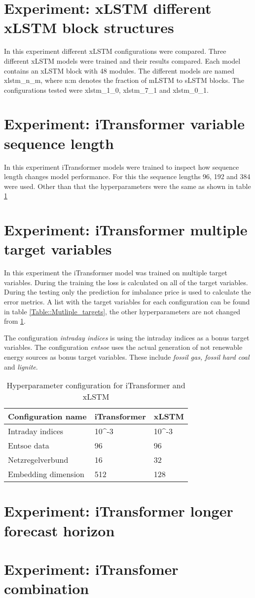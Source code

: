 \documentclass[class=scrbook, crop=false]{standalone}
\begin{document}
\section{Experiment: xLSTM different xLSTM block structures}

In this experiment different xLSTM configurations were compared. 
Three different xLSTM models were trained and their results compared.
Each model contains an xLSTM block with 48 modules.
The different models are named xlstm\_n\_m, where n:m denotes the fraction of mLSTM to sLSTM blocks.
The configurations tested were xlstm\_1\_0, xlstm\_7\_1 and xlstm\_0\_1. 

\section{Experiment: iTransformer variable sequence length}
   
   In this experiment iTransformer models were trained to inspect how sequence length changes model performance.
   For this the sequence lengths 96, 192 and 384 were used. Other than that the hyperparameters were the same as shown in table \ref{Table::raw_hyperparameters}   
   
\section{Experiment: iTransformer multiple target variables}

  In this experiment the iTransformer model was trained on multiple target variables.
  During the training the loss is calculated on all of the target variables. 
  During the testing only the prediction for imbalance price is used to calculate the error metrics.
  A list with the target variables for each configuration can be found in table \ref{Table::Mutliple_targets}, the other hyperparameters are not changed from \ref{Table::raw_hyperparameters}.
  
  The configuration \textit{intraday indices} is using the intraday indices as a bonus target variables. 
  The configuration \textit{entsoe} uses the actual generation of not renewable energy sources as bonus target variables. 
  These include \textit{fossil gas, fossil hard coal} and \textit{lignite}.
  
  \begin{table}[]
\centering
\begin{tabular}{l|l|l}
 Configuration name & iTransformer & xLSTM   \\\hline
 Intraday indices& 10^{-3} & 10^{-3}  \\
 Entsoe data & 96 & 96  \\
 Netzregelverbund & 16 & 32  \\
 Embedding dimension & 512 & 128  \\
 
\end{tabular}
\caption{Hyperparameter configuration for iTransformer and xLSTM}
\label{Table::raw_hyperparameters}
\end{table}

\section{Experiment: iTransformer longer forecast horizon}

\section{Experiment: iTransfomer combination}
\end{document}

